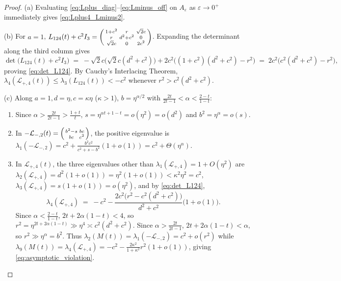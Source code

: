 \documentclass[11pt,a4paper]{article}
\theoremstyle{plain}
\theoremstyle{definition}
\theoremstyle{remark}
\begin{document}
\begin{proof}
(a) Evaluating \eqref{eq:Lplus_diag}--\eqref{eq:Lminus_off} on $A_\varepsilon$ as $\varepsilon \to 0^+$ immediately gives \eqref{eq:Lplus4_Lminus2}.

(b) For $a = 1$, $L_{124}(t) + c^2 I_3 = \begin{psmallmatrix} 1+c^2 & r & \sqrt{2}c \\ r & d^2+c^2 & 0 \\ \sqrt{2}c & 0 & 2c^2 \end{psmallmatrix}$. Expanding the determinant along the third column gives
\[
  \det\big(L_{124}(t) + c^2 I_3\big) \;=\; -\sqrt{2}c\big(\sqrt{2}c(d^2 + c^2)\big) + 2c^2\Big((1+c^2)(d^2 + c^2) - r^2\Big) \;=\; 2c^2\Big(c^2(d^2 + c^2) - r^2\Big),
\]
proving \eqref{eq:det_L124}. By Cauchy's Interlacing Theorem, $\lambda_4(\mathcal{L}_{+,4}(t)) \le \lambda_3(L_{124}(t)) < -c^2$ whenever $r^2 > c^2(d^2 + c^2)$.

(c) Along $a = 1, d = \eta, c = \kappa\eta$ ($\kappa > 1$), $b = \eta^{\alpha/2}$ with $\frac{2t}{2t-1} < \alpha < \frac{2-t}{1-t}$:
\begin{enumerate}[label=(\roman*),nosep]
  \item Since $\alpha > \frac{2t}{2t-1} > \frac{1+t}{t}$, $s = \eta^{\alpha t + 1 - t} = o(\eta^2) = o(d^2)$ and $b^2 = \eta^\alpha = o(s)$.
  \item In $-\mathcal{L}_{-,2}(t) = \begin{psmallmatrix} b^2 - s & bc \\ bc & c^2 \end{psmallmatrix}$, the positive eigenvalue is $\lambda_1(-\mathcal{L}_{-,2}) = c^2 + \frac{b^2 c^2}{c^2 + s - b^2}(1 + o(1)) = c^2 + \Theta(\eta^\alpha)$.
  \item In $\mathcal{L}_{+,4}(t)$, the three eigenvalues other than $\lambda_1(\mathcal{L}_{+,4}) = 1 + O(\eta^2)$ are $\lambda_2(\mathcal{L}_{+,4}) = d^2(1 + o(1)) = \eta^2(1 + o(1)) < \kappa^2 \eta^2 = c^2$, $\lambda_3(\mathcal{L}_{+,4}) = s(1 + o(1)) = o(\eta^2)$, and by \eqref{eq:det_L124},
  \[
    \lambda_4(\mathcal{L}_{+,4}) \;=\; -c^2 - \frac{2c^2\big(r^2 - c^2(d^2 + c^2)\big)}{d^2 + c^2}\big(1 + o(1)\big).
  \]
  Since $\alpha < \frac{2-t}{1-t}$, $2t + 2\alpha(1-t) < 4$, so $r^2 = \eta^{2t + 2\alpha(1-t)} \gg \eta^4 \asymp c^2(d^2 + c^2)$. Since $\alpha > \frac{2t}{2t-1}$, $2t + 2\alpha(1-t) < \alpha$, so $r^2 \gg \eta^\alpha = b^2$. Thus $\lambda_2(M(t)) = \lambda_1(-\mathcal{L}_{-,2}) = c^2 + o(r^2)$ while $\lambda_9(M(t)) = \lambda_4(\mathcal{L}_{+,4}) = -c^2 - \frac{2\kappa^2}{1+\kappa^2}r^2(1 + o(1))$, giving \eqref{eq:asymptotic_violation}.
\end{enumerate}
\end{proof}
\end{document}
